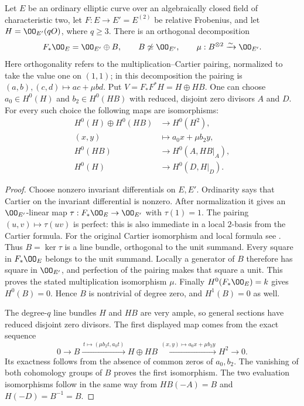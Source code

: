 \begin{lemma}
\label{lem:DE-A3-ordinary-two-pencils}
Let $E$ be an ordinary elliptic curve over an algebraically closed
field of characteristic two, let $F:E\to E'=E^{(2)}$ be relative
Frobenius, and let $H=\OO_{E'}(qO)$, where $q\ge3$.
There is an orthogonal decomposition
\[
 F_*\OO_E=\OO_{E'}\oplus B,\qquad
 B\not\simeq\OO_{E'},\qquad
 \mu:B^{\otimes2}\xrightarrow{\sim}\OO_{E'}.
\]
Here orthogonality refers to the multiplication--Cartier pairing,
normalized to take the value one on $(1,1)$; in this decomposition
the pairing is $(a,b),(c,d)\mapsto ac+\mu bd$.
Put $V=F_*F^*H=H\oplus HB$.
One can choose $a_0\in H^0(H)$ and $b_2\in H^0(HB)$ with
reduced, disjoint zero divisors $A$ and $D$.
For every such choice the following maps are isomorphisms:
\[
\begin{split}
 H^0(H)\oplus H^0(HB)&\longrightarrow H^0(H^2),\\
 (x,y)&\longmapsto a_0x+\mu b_2y,\\
 H^0(HB)&\longrightarrow H^0(A,HB|_A),\\
 H^0(H)&\longrightarrow H^0(D,H|_D).
\end{split}
\]
\end{lemma}
\begin{proof}
Choose nonzero invariant differentials on $E,E'$.
Ordinarity says that Cartier on the invariant differential is nonzero.
After normalization it gives an $\OO_{E'}$-linear map
$\tau:F_*\OO_E\to\OO_{E'}$ with $\tau(1)=1$.
The pairing $(u,v)\mapsto\tau(uv)$ is perfect: this is also immediate
in a local $2$-basis from the Cartier formula.
For the original Cartier isomorphism and local formula see
\cite[0, Theorem~2.1.9, p.~515]{Illusie1979DRW}.
Thus $B=\ker\tau$ is a line bundle, orthogonal to the unit summand.
Every square in $F_*\OO_E$ belongs to the unit summand.
Locally a generator of $B$ therefore has square in $\OO_{E'}$,
and perfection of the pairing makes that square a unit.
This proves the stated multiplication isomorphism $\mu$.
Finally $H^0(F_*\OO_E)=k$ gives $H^0(B)=0$.
Hence $B$ is nontrivial of degree zero, and $H^1(B)=0$ as well.

The degree-$q$ line bundles $H$ and $HB$ are very ample, so general
sections have reduced disjoint zero divisors.
The first displayed map comes from the exact sequence
\[
 0\longrightarrow B
 \xrightarrow{\,t\mapsto(\mu b_2t,a_0t)\,}
 H\oplus HB
 \xrightarrow{\,(x,y)\mapsto a_0x+\mu b_2y\,}
 H^2\longrightarrow0.
\]
Its exactness follows from the absence of common zeros of $a_0,b_2$.
The vanishing of both cohomology groups of $B$ proves the first
isomorphism.  The two evaluation isomorphisms follow in the same way
from $HB(-A)=B$ and $H(-D)=B^{-1}=B$.
\end{proof}

